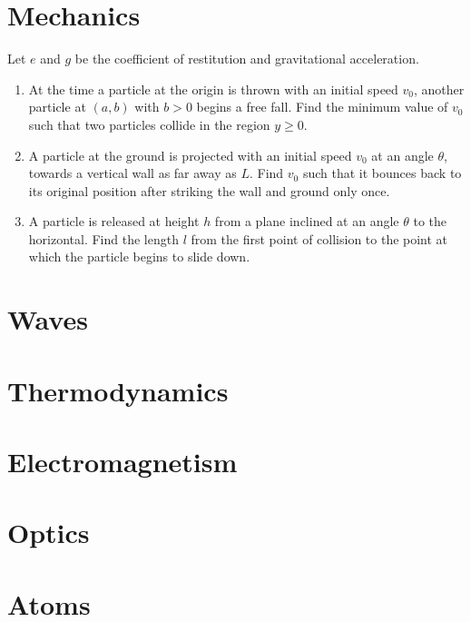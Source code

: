 \documentclass{../../large}
\begin{document}
\section{Mechanics}

Let $e$ and $g$ be the coefficient of restitution and gravitational acceleration. 
\begin{enumerate}
\item At the time a particle at the origin is thrown with an initial speed $v_0$, another particle at $(a,b)$ with $b>0$ begins a free fall. Find the minimum value of $v_0$ such that two particles collide in the region $y\ge0$.
\item A particle at the ground is projected with an initial speed $v_0$ at an angle $\theta$, towards a vertical wall as far away as $L$. Find $v_0$ such that it bounces back to its original position after striking the wall and ground only once. 
\item A particle is released at height $h$ from a plane inclined at an angle $\theta$ to the horizontal. Find the length $l$ from the first point of collision to the point at which the particle begins to slide down.
\end{enumerate}

\section{Waves}
\section{Thermodynamics}
\section{Electromagnetism}
\section{Optics}
\section{Atoms}
% 
\end{document}
